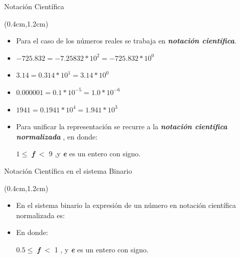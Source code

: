 \begin{frame}{Notación Científica}
 \begin{textblock*}{\textwidth}(0.4cm,1.2cm)
  \begin{itemize}[<+->] \justifying
   \item Para el caso de los números reales se trabaja en \textbf{\textit{\color{blue}    notación científica}}.\\
   \begin{center}   \end{center}
   \item  $-725.832 = -7.25832*10^{2} = -725.832*10^{0}$
   \item  $3.14 = 0.314*10^{1} = 3.14*10^{0}$
   \item  $0.000001 = 0.1*10^{-5} = 1.0*10^{-6}$
   \item  $1941 = 0.1941*10^{4} = 1.941*10^{3}$
   \item Para unificar la representación  se recurre a la \textbf{\textit{\color{blue}notación científica normalizada}} \color{black}, en donde:\\
   \begin{center}
    $1 \leq$ \textbf{\textit{\color{blue}f}} \color{black} $<$ 9 ,y \textbf{\textit{\color{blue}e}} \color{black} es un entero con signo.
   \end{center}
  \end{itemize}
 \end{textblock*}
\end{frame}

\begin{frame}[t]{Notación Científica en el sistema Binario}
 \begin{textblock*}{\textwidth}(0.4cm,1.2cm)
  \begin{itemize} \justifying
   \item En el sistema binario la expresión de un número en notación científica normalizada es:\\
    \begin{center}  \end{center}
   \vspace{0.3cm}
   \item En donde:\\
   \vspace{0.3cm}
   \begin{center}
 $0.5 \leq$ \textbf{\textit{\color{blue}f}} \color{black} $<$ 1 , 
y \textbf{\textit{\color{blue}e}} \color{black} es un entero con signo.
   \end{center}
  \end{itemize}
 \end{textblock*}
\end{frame}

